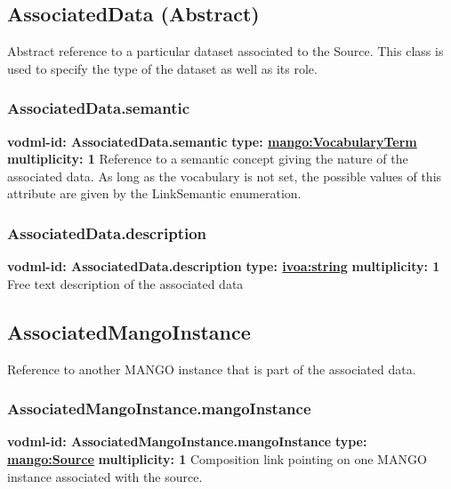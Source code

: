   \subsection{AssociatedData (Abstract)}
  \label{sect:AssociatedData}
    Abstract reference to a particular dataset associated to the Source. This class is used to specify the type of the dataset as well as its role.

    \subsubsection{AssociatedData.semantic}
      \textbf{vodml-id: AssociatedData.semantic} \newline
      \textbf{type: \hyperref[sect:VocabularyTerm]{mango:VocabularyTerm}} \newline
      \textbf{multiplicity: 1} \newline 
      Reference to a semantic concept giving the nature of the associated data. As long as the vocabulary is not set, the possible values of this attribute are given by the LinkSemantic enumeration.

    \subsubsection{AssociatedData.description}
      \textbf{vodml-id: AssociatedData.description} \newline
      \textbf{type: \hyperref[sect:ivoa]{ivoa:string}} \newline
      \textbf{multiplicity: 1} \newline 
      Free text description of the associated data

  \subsection{AssociatedMangoInstance}
  \label{sect:AssociatedMangoInstance}
    Reference to another MANGO instance that is part of the associated data.

    \subsubsection{AssociatedMangoInstance.mangoInstance}
      \textbf{vodml-id: AssociatedMangoInstance.mangoInstance} \newline
      \textbf{type: \hyperref[sect:Source]{mango:Source}} \newline
      \textbf{multiplicity: 1} \newline 
      Composition link pointing on one MANGO instance associated with the source.


